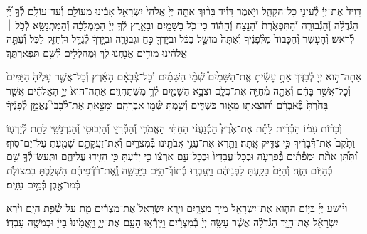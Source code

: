 \documentclass[twoside, openany, parskip=half, 11pt]{book}
\begin{document}
דָּוִיד֙ אֶת־יְיָ֔ לְ֯עֵינֵ֖י כׇּל־הַקָּהָ֑ל וַיֹּ֣אמֶר דָּוִ֗יד בָּר֨וּךְ אַתָּ֤ה יְיָ֙ אֱלֹהֵי֙ יִשְׂרָאֵ֣ל אָבִ֔ינוּ מֵעוֹלָ֖ם וְ֯עַד־עוֹלָֽם׃
לְ֯ךָ֣ יְ֠יָ֠ הַגְּ֯דֻלָּ֨ה וְ֯הַגְּ֯בוּרָ֤ה וְ֯הַתִּפְאֶ֙רֶת֙ וְ֯הַנֵּ֣צַח וְ֯הַה֔וֹד כִּי־כֹ֖ל בַּשָּׁמַ֣יִם וּבָאָ֑רֶץ לְ֯ךָ֤ יְיָ֙ הַמַּמְלָכָ֔ה וְ֯הַמִּתְנַשֵּׂ֖א לְ֯כֹ֥ל ׀ לְ֯רֹֽאשׁ׃
וְ֯הָעֹ֤שֶׁר וְ֯הַכָּבוֹד֙ מִלְּ֯פָנֶ֔יךָ וְ֯אַתָּה֙ מוֹשֵׁ֣ל בַּכֹּ֔ל וּבְיָדְךָ֖ כֹּ֣חַ וּגְבוּרָ֑ה וּבְיָ֣דְךָ֔ לְ֯גַדֵּ֥ל וּלְחַזֵּ֖ק לַכֹּֽל׃
וְ֯עַתָּ֣ה אֱלֹהֵ֔ינוּ מוֹדִ֥ים אֲנַ֖חְנוּ לָ֑ךְ וּֽמְהַלְלִ֖ים לְ֯שֵׁ֥ם תִּפְאַרְתֶּֽךָ׃





אַתָּה־ה֣וּא
יְיָ לְ֯בַדֶּ֒ךָ֒ אַתָּ֣ עָשִׂ֡יתָ אֶֽת־הַשָּׁמַ֩יִם֩ שְׁ֯מֵ֨י הַשָּׁמַ֜יִם וְ֯כׇל־צְ֯בָאָ֗ם הָאָ֜רֶץ וְ֯כׇל־אֲשֶׁ֤ר עָלֶ֙יהָ֙ הַיַּמִּים֙ וְ֯כׇל־אֲשֶׁ֣ר בָּהֶ֔ם וְ֯אַתָּ֖ה מְ֯חַיֶּ֣ה אֶת־כֻּלָּ֑ם וּצְבָ֥א הַשָּׁמַ֖יִם לְ֯ךָ֥ מִשְׁתַּחֲוִֽים׃
אַתָּה־הוּא֙ יְיָ֣ הָאֱלֹהִ֔ים אֲשֶׁ֤ר בָּחַ֙רְתָּ֙ בְּ֯אַבְרָ֔ם וְ֯הוֹצֵאת֖וֹ מֵא֣וּר כַּשְׂדִּ֑ים וְ֯שַׂ֥מְתָּ שְּׁ֯מ֖וֹ אַבְרָהָֽם׃ וּמָצָ֣אתָ אֶת־לְ֯בָבוֹ֮ נֶאֱמָ֣ן לְ֯פָנֶ֒יךָ֒

וְ֯כָר֨וֹת עִמּ֜וֹ הַבְּ֯רִ֗ית לָתֵ֡ת אֶת־אֶ֩רֶץ֩ הַכְּ֯נַעֲנִ֨י הַחִתִּ֜י הָאֱמֹרִ֧י וְ֯הַפְּ֯רִזִּ֛י וְ֯הַיְבוּסִ֥י וְ֯הַגִּרְגָּשִׁ֖י לָתֵ֣ת לְ֯זַרְע֑וֹ וַתָּ֙קֶם֙ אֶת־דְּ֯בָרֶ֔יךָ כִּ֥י צַדִּ֖יק אָֽתָּה׃ וַתֵּ֛רֶא אֶת־עֳנִ֥י אֲבֹתֵ֖ינוּ בְּ֯מִצְרָ֑יִם וְ֯אֶת־זַעֲקָתָ֥ם שָׁמַ֖עְתָּ עַל־יַם־סֽוּף׃ וַ֠תִּתֵּ֠ן אֹתֹ֨ת וּמֹֽפְ֯תִ֜ים בְּ֯פַרְעֹ֤ה וּבְכׇל־עֲבָדָיו֙ וּבְכׇל־עַ֣ם אַרְצ֔וֹ כִּ֣י יָדַ֔עְתָּ כִּ֥י הֵזִ֖ידוּ עֲלֵיהֶ֑ם וַתַּֽעַשׂ־לְ֯ךָ֥ שֵׁ֖ם כְּ֯הַיּ֥וֹם הַזֶּֽה׃
וְ֯הַיָּם֙ בָּקַ֣עְתָּ לִפְנֵיהֶ֔ם וַיַּֽעַבְר֥וּ בְ֯תוֹךְ֯־הַיָּ֖ם בַּיַּבָּשָׁ֑ה וְֽ֯אֶת־רֹ֨דְ֯פֵיהֶ֜ם הִשְׁלַ֧כְתָּ בִמְצוֹלֹ֛ת כְּ֯מוֹ־אֶ֖בֶן בְּ֯מַ֥יִם עַזִּֽים׃

וַיּ֨וֹשַׁע
יְיָ֜ בַּיּ֥וֹם הַה֛וּא אֶת־יִשְׂרָאֵ֖ל מִיַּ֣ד מִצְרָ֑יִם וַיַּ֤רְא יִשְׂרָאֵל֙ אֶת־מִצְרַ֔יִם מֵ֖ת עַל־שְׂ֯פַ֥ת הַיָּֽם׃
וַיַּ֨רְא יִשְׂרָאֵ֜ל אֶת־הַיָּ֣ד הַגְּ֯דֹלָ֗ה אֲשֶׁ֨ר עָשָׂ֤ה יְיָ֙ בְּ֯מִצְרַ֔יִם וַיִּֽירְ֯א֥וּ הָעָ֖ם אֶת־יְיָ֑ וַיַּֽאֲמִ֙ינוּ֙ בַּייָ֔ וּבְמֹשֶׁ֖ה עַבְדּֽוֹ׃
\end{document}
